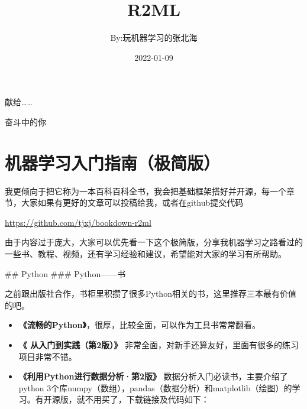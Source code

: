 \documentclass[]{ctexbook}
\title{R2ML}
\author{By:玩机器学习的张北海}
\date{2022-01-09}
\providecommand{\tightlist}{%
  \setlength{\itemsep}{0pt}\setlength{\parskip}{0pt}}
\begin{document}
\maketitle


\thispagestyle{empty}

\begin{center}
献给……

奋斗中的你
\end{center}

\setlength{\abovedisplayskip}{-5pt}
\setlength{\abovedisplayshortskip}{-5pt}

{
\setcounter{tocdepth}{2}
\tableofcontents
}
\listoftables
\listoffigures
\hypertarget{ux673aux5668ux5b66ux4e60ux5165ux95e8ux6307ux5357ux6781ux7b80ux7248}{%
\chapter{机器学习入门指南（极简版）}\label{ux673aux5668ux5b66ux4e60ux5165ux95e8ux6307ux5357ux6781ux7b80ux7248}}

我更倾向于把它称为一本百科百科全书，我会把基础框架搭好并开源，每一个章节，大家如果有更好的文章可以投稿给我，或者在github提交代码

\url{https://github.com/tjxj/bookdown-r2ml}

由于内容过于庞大，大家可以优先看一下这个极简版，分享我机器学习之路看过的一些书、教程、视频，还有学习经验和建议，希望能对大家的学习有所帮助。

\#\# Python
\#\#\# Python------书

之前跟出版社合作，书柜里积攒了很多Python相关的书，这里推荐三本最有价值的吧。

\begin{itemize}
\tightlist
\item
  \textbf{《流畅的Python》}，很厚，比较全面，可以作为工具书常常翻看。
\end{itemize}

\begin{itemize}
\tightlist
\item
  \textbf{《 从入门到实践（第2版）》} 非常全面，对新手还算友好，里面有很多的练习项目非常不错。
\end{itemize}

\begin{itemize}
\tightlist
\item
  \textbf{《利用Python进行数据分析·第2版》} 数据分析入门必读书，主要介绍了python 3个库numpy（数组），pandas（数据分析）和matplotlib（绘图）的学习。有开源版，就不用买了，下载链接及代码如下：
\end{itemize}
\end{document}

